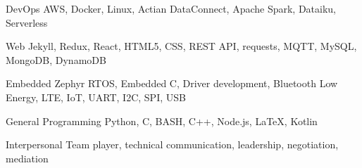

\begin{cvskills}

  \cvskill
    {DevOps} %
    {AWS, Docker, Linux, Actian DataConnect, Apache Spark, Dataiku, Serverless} %

  \cvskill
    {Web} %
    {Jekyll, Redux, React, HTML5, CSS, REST API, requests, MQTT, MySQL, MongoDB, DynamoDB} %

  \cvskill
    {Embedded} %
    {Zephyr RTOS, Embedded C, Driver development, Bluetooth Low Energy, LTE, IoT, UART, I2C, SPI, USB}%

  \cvskill
    {General Programming} %
    {Python, C, BASH, C++, Node.js, LaTeX, Kotlin} %

  \cvskill
    {Interpersonal} %
    {Team player, technical communication, leadership, negotiation, mediation} %


\end{cvskills}
